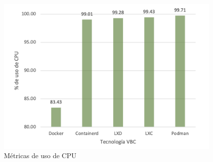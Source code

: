 \begin{figure}[H]
    \centering
    \includegraphics[scale=0.5] {tablas-images/cp4/cpu.png}
    \caption{Métricas de uso de CPU}\label{fig:tabla-metricas-cpu}
\end{figure}